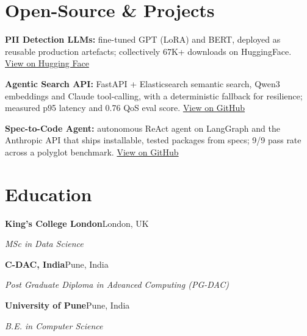 \documentclass[10pt,a4paper]{article}
\begin{document}
\section{Open-Source \& Projects}
\begin{tight}
  \item \textbf{PII Detection LLMs:} fine-tuned GPT (LoRA) and BERT, deployed as reusable production artefacts; collectively 67K+ downloads on HuggingFace. \href{https://huggingface.co/ab-ai/pii_model}{View on Hugging Face}
  \item \textbf{Agentic Search API:} FastAPI + Elasticsearch semantic search, Qwen3 embeddings and Claude tool-calling, with a deterministic fallback for resilience; measured p95 latency and 0.76 QoS eval score. \href{https://github.com/abhijeetscode/search-agent}{View on GitHub}
  \item \textbf{Spec-to-Code Agent:} autonomous ReAct agent on LangGraph and the Anthropic API that ships installable, tested packages from specs; 9/9 pass rate across a polyglot benchmark. \href{https://github.com/abhijeetscode/Spec-to-Code-Agent}{View on GitHub}
\end{tight}

\section{Education}
{\color{company}\bfseries King's College London}\hfill {\color{muted}London, UK}\par
{\itshape MSc in Data Science}\par\vspace{2pt}
{\color{company}\bfseries C-DAC, India}\hfill {\color{muted}Pune, India}\par
{\itshape Post Graduate Diploma in Advanced Computing (PG-DAC)}\par\vspace{2pt}
{\color{company}\bfseries University of Pune}\hfill {\color{muted}Pune, India}\par
{\itshape B.E. in Computer Science}\par
\end{document}
